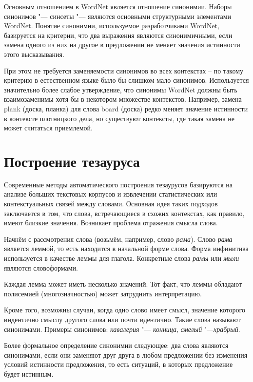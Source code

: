 \documentclass[coursework]{SCWorks}
\begin{document}
Основным отношением в WordNet является отношение синонимии. Наборы 
синонимов "--- синсеты "--- являются основными структурными элементами WordNet.  
Понятие синонимии, используемое разработчиками WordNet, базируется на критерии, что два выражения являются синонимичными, если замена одного из них на другое в предложении не меняет значения истинности этого высказывания.


При этом не требуется заменяемости синонимов во всех контекстах – по такому 
критерию в естественном языке было бы слишком мало синонимов. Используется 
значительно более слабое утверждение, что синонимы WordNet должны быть 
взаимозаменимы хотя бы в некотором множестве контекстов. Например, замена plank (доска, планка) для слова board (доска) редко меняет значение истинности в контексте плотницкого дела, но существуют контексты, где такая замена не может считаться приемлемой.

\section{Построение тезауруса}

Современные методы автоматического построения тезаурусов базируются на анализе больших текстовых корпусов и извлечении статистических или контекстуальных связей между словами. Основная идея таких подходов заключается в том, что слова, встречающиеся в схожих контекстах, как правило, имеют близкие значения. Возникает проблема отражения смысла слова.

Начнём с рассмотрения слова (возьмём, например, слово \textit{рама}). Слово \textit{рама} является леммой, то есть находится в начальной форме слова. Форма инфинитива используется в качестве леммы для глагола. Конкретные слова \textit{рамы} или \textit{мыли} являются словоформами.

Каждая лемма может иметь несколько значений. Тот факт, что леммы обладают полисемией (многозначностью) может затруднить интерпретацию. 

Кроме того, возможны случаи, когда одно слово имеет смысл, значение которого индентично смыслу другого слова или почти идентично. 
Такие слова называют синонимами. Примеры синонимов: \textit{кавалерия} "--- \textit{конница}, \textit{смелый} "---\textit{храбрый}.

Более формальное определение синонимии следующее: два слова являются синонимами, если они заменяют друг друга в любом предложении без изменения условий истинности предложения, то есть ситуаций, в которых предложение будет истинным.
\end{document}
